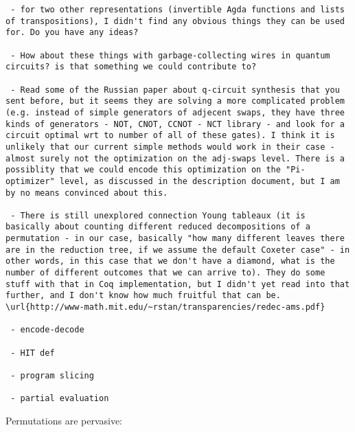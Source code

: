 \documentclass{article}
\begin{document}
\begin{verbatim}
 - for two other representations (invertible Agda functions and lists of transpositions), I didn't find any obvious things they can be used for. Do you have any ideas?

 - How about these things with garbage-collecting wires in quantum circuits? is that something we could contribute to? 

 - Read some of the Russian paper about q-circuit synthesis that you sent before, but it seems they are solving a more complicated problem (e.g. instead of simple generators of adjecent swaps, they have three kinds of generators - NOT, CNOT, CCNOT - NCT library - and look for a circuit optimal wrt to number of all of these gates). I think it is unlikely that our current simple methods would work in their case - almost surely not the optimization on the adj-swaps level. There is a possiblity that we could encode this optimization on the "Pi-optimizer" level, as discussed in the description document, but I am by no means convinced about this.

 - There is still unexplored connection Young tableaux (it is basically about counting different reduced decompositions of a permutation - in our case, basically "how many different leaves there are in the reduction tree, if we assume the default Coxeter case" - in other words, in this case that we don't have a diamond, what is the number of different outcomes that we can arrive to). They do some stuff with that in Coq implementation, but I didn't yet read into that further, and I don't know how much fruitful that can be.  
\url{http://www-math.mit.edu/~rstan/transparencies/redec-ams.pdf}

 - encode-decode

 - HIT def

 - program slicing

 - partial evaluation

 \end{verbatim}

Permutations are pervasive:
\end{document}
